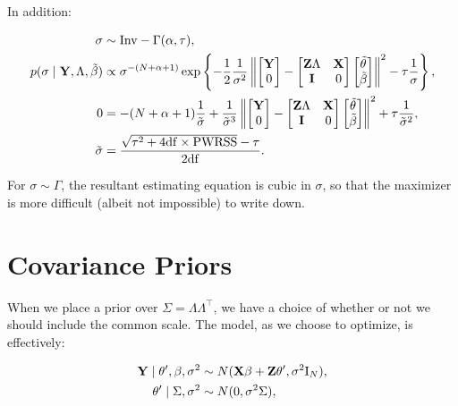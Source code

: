 \documentclass[10pt]{article}
\begin{document}
\noindent In addition:

\begin{align*}
\sigma &\sim \mathrm{Inv}-\Gamma(\alpha, \tau), \\
p(\sigma \mid {\bf Y}, \Lambda, \tilde\beta) & \propto
\sigma^{-(N+ \alpha + 1)} \exp\left\{-\frac{1}{2}\frac{1}{\sigma^2}
\left\|\begin{bmatrix}{\bf Y} \\ 0 \end{bmatrix}
- \begin{bmatrix} {\bf Z}\Lambda & {\bf X} \\ {\bf I} &
  0 \end{bmatrix}
\begin{bmatrix}\tilde\theta \\ \tilde\beta \end{bmatrix}
\right\|^2 - \tau\frac{1}{\sigma}\right\}, \\
0 & = -(N + \alpha + 1)\frac{1}{\tilde\sigma} 
+\frac{1}{\tilde\sigma^3}
\left\|\begin{bmatrix}{\bf Y} \\ 0 \end{bmatrix}
- \begin{bmatrix} {\bf Z}\Lambda & {\bf X} \\ {\bf I} &
  0 \end{bmatrix}
\begin{bmatrix}\tilde\theta \\ \tilde\beta \end{bmatrix}
\right\|^2
+ \tau\frac{1}{\tilde\sigma^2}, \\
\tilde\sigma & = \dfrac{\sqrt{\tau^2 +
    4\mathrm{df}\times\mathrm{PWRSS}}-\tau}{2\mathrm{df}}.
\end{align*}

For $\sigma \sim \Gamma$, the resultant estimating equation is cubic
in $\sigma$, so that the maximizer is more difficult (albeit not
impossible) to write down.

\newpage

\section*{Covariance Priors}

When we place a prior over $\Sigma = \Lambda\Lambda^\top$, we have a
choice of whether or not we should include the common scale. The
model, as we choose to optimize, is effectively:

\begin{align*}
{\bf Y} \mid \theta', \beta, \sigma^2 & \sim
N({\bf X}\beta + {\bf Z}\theta', \sigma^2 \mathrm{I}_N), \\
\theta' \mid \Sigma, \sigma^2 & \sim N(0, \sigma^2\Sigma),
\end{align*}
\end{document}

